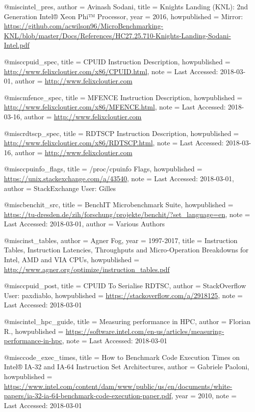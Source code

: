 @misc{intel_pres,
    author  = {Avinash Sodani},
    title   = {Knights Landing (KNL): 2nd Generation Intel® Xeon Phi™ Processor},
    year    = {2016},
    howpublished      = {Mirror: \url{https://github.com/acwilson96/MicroBenchmarking-KNL/blob/master/Docs/References/HC27.25.710-Knights-Landing-Sodani-Intel.pdf}
    }
}

@misc{cpuid_spec,
  title = {{CPUID Instruction Description}},
  howpublished = {\url{http://www.felixcloutier.com/x86/CPUID.html}},
  note = {Last Accessed: 2018-03-01},
  author = {\url{http://www.felixcloutier.com}}
}

@misc{mfence_spec,
  title = {{MFENCE Instruction Description}},
  howpublished = {\url{http://www.felixcloutier.com/x86/MFENCE.html}},
  note = {Last Accessed: 2018-03-16},
  author = {\url{http://www.felixcloutier.com}}
}

@misc{rdtscp_spec,
  title = {{RDTSCP Instruction Description}},
  howpublished = {\url{http://www.felixcloutier.com/x86/RDTSCP.html}},
  note = {Last Accessed: 2018-03-16},
  author = {\url{http://www.felixcloutier.com}}
}

@misc{cpuinfo_flags,
    title = {{/proc/cpuinfo Flags}},
    howpublished = {\url{https://unix.stackexchange.com/a/43540}},
    note = {Last Accessed: 2018-03-01},
    author = {StackExchange User: Gilles}
}

@misc{benchit_src,
    title = {{BenchIT Microbenchmark Suite}},
    howpublished = {\url{https://tu-dresden.de/zih/forschung/projekte/benchit/?set_language=en}},
    note = {Last Accessed: 2018-03-01},
    author = {Various Authors}
}

@misc{inst_tables,
    author  = {Agner Fog},
    year    = {1997-2017},
    title = {{Instruction Tables, Instruction Latencies, Throughputs and Micro-Operation Breakdowns for Intel, AMD and VIA CPUs}},
    howpublished = {\url{http://www.agner.org/optimize/instruction_tables.pdf}}
}

@misc{cpuid_post,
    title   = {CPUID To Serialise RDTSC},
    author  = {StackOverflow User: paxdiablo},
    howpublished = {\url{https://stackoverflow.com/a/2918125}},
    note = {Last Accessed: 2018-03-01}
}

@misc{intel_hpc_guide,
    title = {Measuring performance in HPC},
    author = {Florian R.},
    howpublished = {\url{https://software.intel.com/en-us/articles/measuring-performance-in-hpc}},
    note = {Last Accessed: 2018-03-01}
}

@misc{code_exec_times,
    title = {How to Benchmark Code Execution Times on Intel® IA-32 and IA-64 Instruction Set Architectures},
    author = {Gabriele Paoloni},
    howpublished = {\url{https://www.intel.com/content/dam/www/public/us/en/documents/white-papers/ia-32-ia-64-benchmark-code-execution-paper.pdf}},
    year = {2010},
    note = {Last Accessed: 2018-03-01}
}

